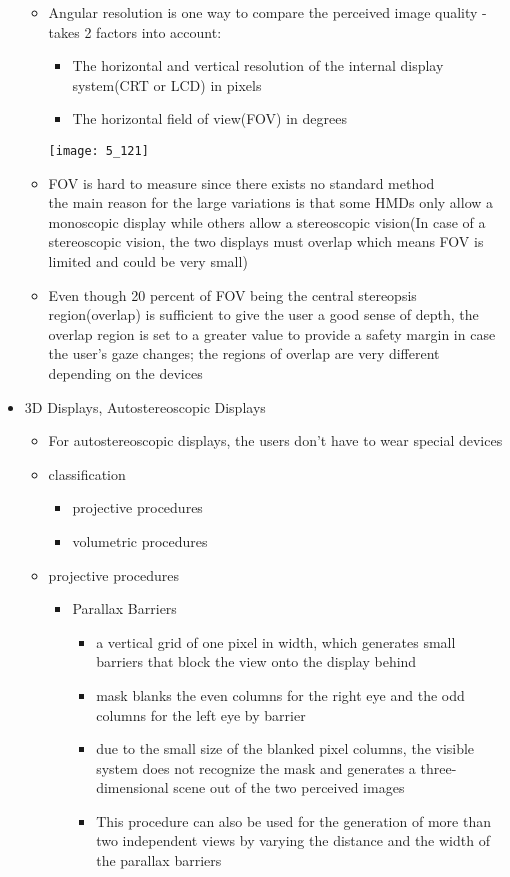 \documentclass{standalone}
\begin{document}
\begin{itemize}
\begin{itemize}
		\item Angular resolution is one way to compare the perceived image quality - takes 2 factors into account:
		\begin{itemize}
			\item The horizontal and vertical resolution of the internal display system(CRT or
LCD) in pixels
			\item The horizontal field of view(FOV) in degrees
		\end{itemize}
		\texttt{[image: 5\_121]}
		
		\item FOV is hard to measure since there exists no standard method \\
		the main reason for the large variations is that some HMDs only allow a monoscopic display while others allow a stereoscopic vision(In case of a stereoscopic vision, the two displays must overlap which means FOV is limited and could be very small)
		\item Even though 20 percent of FOV being the central stereopsis region(overlap) is sufficient to give the user a good sense of depth, the overlap region is set to a greater value to provide a safety margin in case the user's gaze changes; the regions of overlap are very different depending on the devices
	\end{itemize}
	
	\item 3D Displays, Autostereoscopic Displays
	\begin{itemize}
		\item For autostereoscopic displays, the users don't have to wear special devices
		\item classification
			\begin{itemize}
				\item projective procedures
				\item volumetric procedures
			\end{itemize}
		\item projective procedures
			\begin{itemize}
				\item Parallax Barriers
					\begin{itemize}
						\item a vertical grid of one pixel in width, which generates small barriers that block the view onto the display behind 
						\item mask blanks the even columns for the right eye and the odd columns for the left eye by barrier
						\item due to the small size of the blanked pixel columns, the visible system does not recognize the mask and generates a three-dimensional scene out of the two perceived images 
						\item This procedure can also be used for the generation of more than two independent views by varying the distance and the width of the parallax barriers
					\end{itemize}
				\end{itemize}	
				

\end{itemize}
\end{itemize}
\end{document}

